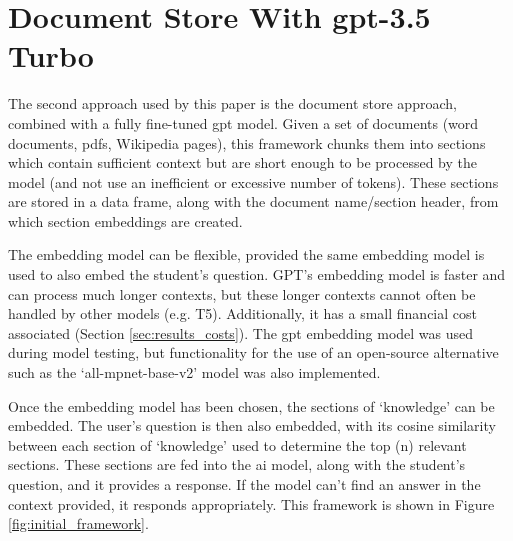 


\section{Document Store With \acrshort{gpt}-3.5 Turbo}
The second approach used by this paper is the document store approach, combined with a fully fine-tuned \acrshort{gpt} model. Given a set of documents (word documents, \acrshort{pdf}s, Wikipedia pages), this framework chunks them into sections which contain sufficient context but are short enough to be processed by the model (and not use an inefficient or excessive number of tokens). These sections are stored in a data frame, along with the document name/section header, from which section embeddings are created.

The embedding model can be flexible, provided the same embedding model is used to also embed the student's question. GPT's embedding model is faster and can process much longer contexts, but these longer contexts cannot often be handled by other models (e.g. T5). Additionally, it has a small financial cost associated (Section \ref{sec:results_costs}). The \acrshort{gpt} embedding model was used during model testing, but functionality for the use of an open-source alternative such as the `all-mpnet-base-v2' model \citep{huggingface_tokeniser_model} was also implemented.

Once the embedding model has been chosen, the sections of `knowledge' can be embedded. The user's question is then also embedded, with its cosine similarity between each section of `knowledge' used to determine the top (n) relevant sections. These sections are fed into the \acrshort{ai} model, along with the student's question, and it provides a response. If the model can't find an answer in the context provided, it responds appropriately. This framework is shown in Figure \ref{fig:initial_framework}.

